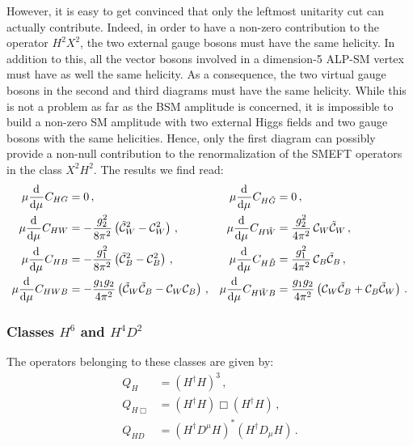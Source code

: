 However, it is easy to get convinced that only the leftmost unitarity cut can actually contribute.
Indeed, in order to have a non-zero contribution to the operator $H^2 X^2$, the two external gauge bosons must have the same helicity.
In addition to this, all the vector bosons involved in a dimension-5 ALP-SM vertex must have as well the same helicity. As a consequence, the two virtual gauge bosons in the second and third diagrams must have the same helicity.
While this is not a problem as far as the BSM amplitude is concerned, it is impossible to build a non-zero SM amplitude with two external Higgs fields and two gauge bosons with the same helicities.
Hence, only the first diagram can possibly provide a non-null contribution to the renormalization of the SMEFT operators in the class $X^2 H^2$. The results we find read:
%
\begin{align}
\mu \dv[]{}{\mu} {C}_{HG} &= 0\,, & \mu \dv[]{}{\mu} {C}_{H\tilde{G}} &= 0\,,  \\
\mu \dv[]{}{\mu} {C}_{HW} &= -\frac{g_2^2}{8\pi^2}  \left(\tilde{\mathcal{C}}_{W}^2 - \mathcal{C}^2_{W} \right)\,, & \mu \dv[]{}{\mu} {C}_{H\tilde{W}} &=  \frac{g_2^2}{4\pi^2}\,\mathcal{C}_{W} \tilde{\mathcal{C}}_{W}\,,  \\
\mu \dv[]{}{\mu} {C}_{HB} &= -\frac{g_1^2}{8\pi^2}  \left(\tilde{\mathcal{C}}_{B}^2 - \mathcal{C}^2_{B} \right)\,, & \mu \dv[]{}{\mu} {C}_{H\tilde{B}} &= \frac{g_1^2}{4\pi^2} \, \mathcal{C}_{B} \tilde{\mathcal{C}}_{B}\,,    \\
\mu \dv[]{}{\mu} {C}_{HWB} &= -\frac{g_1 g_2}{4\pi^2}  \left(\tilde{\mathcal{C}}_{W}\tilde{\mathcal{C}}_{B} - \mathcal{C}_{W}\mathcal{C}_{B} \right)\,,
 &
 \mu \dv[]{}{\mu} {C}_{H\tilde{W}B} &= \frac{g_1 g_2}{4\pi^2}\left(\mathcal{C}_{W} \tilde{\mathcal{C}}_{B}+ \mathcal{C}_{B} \tilde{\mathcal{C}}_{W}\right)\,.
\end{align}

\subsubsection{Classes $H^6$ and $H^4D^2$}

The operators belonging to these classes are given by: 
\begin{align}
Q_H &= (H^\dagger H)^3\,, \\
Q_{H\Box} &= (H^\dagger H)\Box(H^\dagger H)\,, \\
Q_{HD} &= (H^\dagger D^\mu H)^*(H^\dagger D_\mu H)\,.
\end{align}

